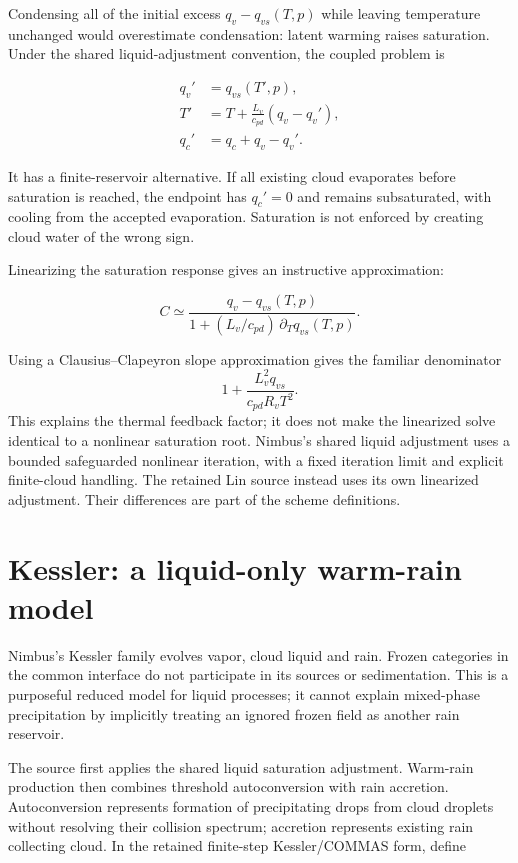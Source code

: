 \documentclass[
  11pt,
]{report}
\begin{document}
Condensing all of the initial excess \(q_v-q_{vs}(T,p)\) while leaving
temperature unchanged would overestimate condensation: latent warming
raises saturation. Under the shared liquid-adjustment convention, the
coupled problem is

\[\begin{aligned}
q_v' &= q_{vs}(T',p), \\
T' &= T+\frac{L_v}{c_{pd}}(q_v-q_v'), \\
q_c' &= q_c+q_v-q_v'.
\end{aligned}\]

It has a finite-reservoir alternative. If all existing cloud evaporates
before saturation is reached, the endpoint has \(q_c'=0\) and remains
subsaturated, with cooling from the accepted evaporation. Saturation is
not enforced by creating cloud water of the wrong sign.

Linearizing the saturation response gives an instructive approximation:

\[C\simeq
\frac{q_v-q_{vs}(T,p)}
     {1+(L_v/c_{pd})\,\partial_T q_{vs}(T,p)}.\]

Using a Clausius--Clapeyron slope approximation gives the familiar
denominator
\[1+\frac{L_v^2q_{vs}}{c_{pd}R_vT^2}.\]
This explains the thermal
feedback factor; it does not make the linearized solve identical to a
nonlinear saturation root. Nimbus's shared liquid adjustment uses a
bounded safeguarded nonlinear iteration, with a fixed iteration limit
and explicit finite-cloud handling. The retained Lin source instead uses
its own linearized adjustment. Their differences are part of the scheme
definitions.

\section{Kessler: a liquid-only warm-rain
model}\label{kessler-a-liquid-only-warm-rain-model}

Nimbus's Kessler family evolves vapor, cloud liquid and rain. Frozen
categories in the common interface do not participate in its sources or
sedimentation. This is a purposeful reduced model for liquid processes;
it cannot explain mixed-phase precipitation by implicitly treating an
ignored frozen field as another rain reservoir.

The source first applies the shared liquid saturation adjustment.
Warm-rain production then combines threshold autoconversion with rain
accretion. Autoconversion represents formation of precipitating drops
from cloud droplets without resolving their collision spectrum;
accretion represents existing rain collecting cloud. In the retained
finite-step Kessler/COMMAS form, define
\end{document}
